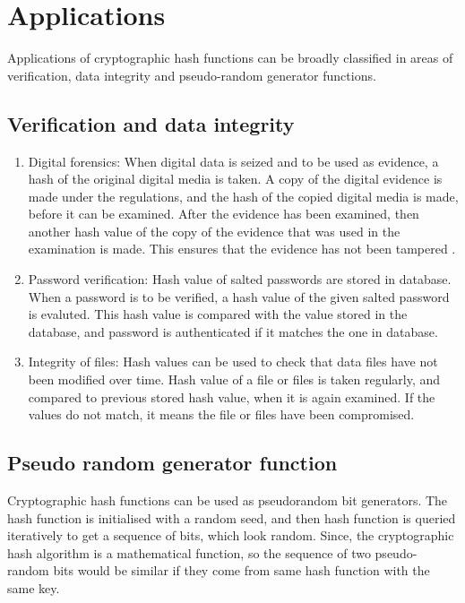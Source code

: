 \newpage

\section{Applications}

Applications of cryptographic hash functions can be broadly classified in areas of verification, data
integrity and pseudo-random generator functions.

  \subsection{Verification and data integrity}
  \begin{enumerate}

    \item Digital forensics: When digital data is seized and to be used as evidence, a hash of the original
    digital media is taken. A copy of the digital evidence is made under the regulations, and the hash of the
    copied digital media is made, before it can be examined. After the evidence has been examined, then another
    hash value of the copy of the evidence that was used in the examination is made. This ensures that the evidence
    has not been tampered \cite{00013}.

    \item Password verification: Hash value of salted passwords are stored in database. When a password is to be
    verified, a hash value of the given salted password is evaluted. This hash value is compared
    with the value stored in the database, and password is authenticated if it matches the one in database.

    \item Integrity of files: Hash values can be used to check that data files have not been modified over
    time. Hash value of a file or files is taken regularly, and compared to previous stored hash value, when it is
    again examined. If the values do not match, it means the file or files have been compromised.
  \end{enumerate}

  \subsection{Pseudo random generator function}
  Cryptographic hash functions can be used as pseudorandom bit generators. The hash function is initialised
  with a random seed, and then hash function is queried iteratively to get a sequence of bits, which look random.
  Since, the cryptographic hash algorithm is a mathematical function, so the sequence of two pseudo-random bits 
  would be similar if they come from same hash function with the same key.
